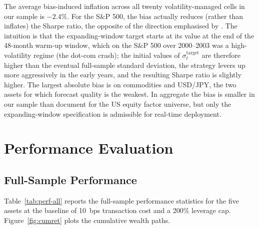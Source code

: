 \documentclass[12pt, a4paper]{article}
\newcommand{\stgt}{\sigma^{\mathrm{target}}}
\begin{document}
\noindent The average bias-induced inflation across all twenty volatility-managed cells in
our sample is $-2.4\%$. For the S\&P 500, the bias actually reduces (rather than inflates)
the Sharpe ratio, the opposite of the direction emphasised by \citet{liu2019}. The intuition
is that the expanding-window target starts at its value at the end of the 48-month warm-up
window, which on the S\&P 500 over 2000--2003 was a high-volatility regime (the dot-com
crash); the initial values of $\stgt_t$ are therefore higher than the eventual full-sample
standard deviation, the strategy levers up more aggressively in the early years, and the
resulting Sharpe ratio is slightly higher. The largest absolute bias is on commodities and
USD/JPY, the two assets for which forecast quality is the weakest. In aggregate the
bias is smaller in our sample than \citet{liu2019} document for the US equity factor
universe, but only the expanding-window specification is admissible for real-time
deployment.

\section{Performance Evaluation}

\subsection{Full-Sample Performance}

Table~\ref{tab:perf-all} reports the full-sample performance statistics for the five
assets at the baseline of 10~bps transaction cost and a 200\% leverage cap.
Figure~\ref{fig:cumret} plots the cumulative wealth paths.
\end{document}
